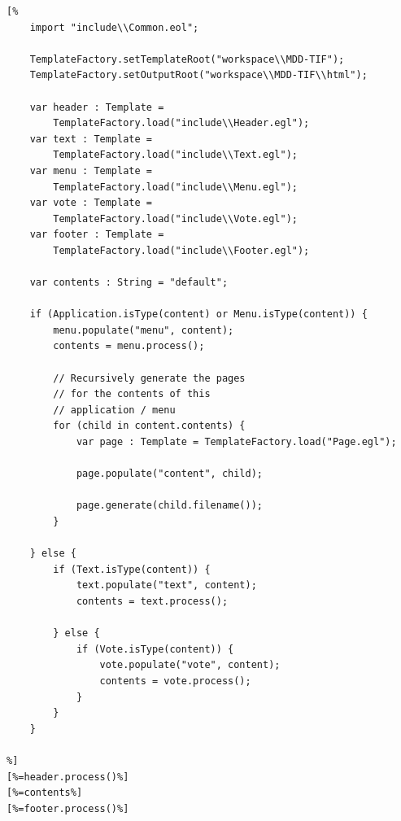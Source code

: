 \begin{lstlisting}[float=tbp, basicstyle=\ttfamily\footnotesize, nolol=true, flexiblecolumns=true, caption=EGL template that generates mockup HTML screens for a TVApp model, tabsize=2, label=lst:Mockup, language=EOL]
[%
	import "include\\Common.eol";

	TemplateFactory.setTemplateRoot("workspace\\MDD-TIF");
	TemplateFactory.setOutputRoot("workspace\\MDD-TIF\\html");
	
	var header : Template = 
		TemplateFactory.load("include\\Header.egl");
	var text : Template = 
		TemplateFactory.load("include\\Text.egl");	
	var menu : Template = 
		TemplateFactory.load("include\\Menu.egl");
	var vote : Template = 
		TemplateFactory.load("include\\Vote.egl");
	var footer : Template = 
		TemplateFactory.load("include\\Footer.egl");
	
	var contents : String = "default";
	
	if (Application.isType(content) or Menu.isType(content)) {
		menu.populate("menu", content);
		contents = menu.process();
		
		// Recursively generate the pages 
		// for the contents of this
		// application / menu
		for (child in content.contents) {
			var page : Template = TemplateFactory.load("Page.egl");
		
			page.populate("content", child);
			
			page.generate(child.filename());
		}

	} else {
		if (Text.isType(content)) {
			text.populate("text", content);
			contents = text.process();

		} else {
			if (Vote.isType(content)) {
				vote.populate("vote", content);
				contents = vote.process();
			}
		}
	}
	
%]
[%=header.process()%]
[%=contents%]
[%=footer.process()%]
\end{lstlisting}



